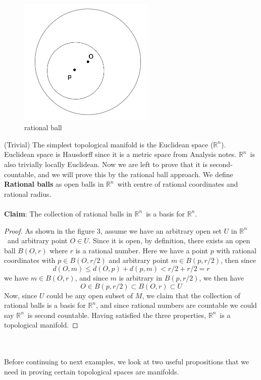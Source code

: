 \documentclass[12pt,twoside]{article}
\newcommand{\rn}{$\mathbb{R}^n$}
\begin{document}
\begin{figure}[tb]
\centering
\includegraphics[width=65mm]{rational ball.png} 
\caption{rational ball}
\end{figure}
\begin{example}{(Trivial)}
The simplest topological manifold is the Euclidean space (\rn). Euclidean space is Hausdorff since it is a metric space from Analysis notes. \rn\ is also trivially locally Euclidean. Now we are left to prove that it is second-countable, and we will prove this by the rational ball approach. We define {\bf Rational balls} as open balls in \rn\ with centre of rational coordinates and rational radius.\\
\\
{\bf Claim}: The collection of rational balls in \rn\ is a basis for \rn. \cite{intro to mfds}

\begin{proof}
As shown in the figure 3, assume we have an arbitrary open set $U$ in \rn\ and arbitrary point $O\in U$. Since it is open, by definition, there exists an open ball $B(O,r)$ where $r$ is a rational number. Here we have a point $p$ with rational coordinates with $p\in B(O,r/2)$ and arbitrary point $m\in B(p,r/2)$, then since
\[
    d(O,m)\leqslant d(O,p)+d(p,m)<r/2+r/2=r
\]
we have $m\in B(O,r)$, and since $m$ is arbitrary in $B(p,r/2)$, we then have
\[
O\in B(p,r/2)\subset B(O,r)\subset U
\]
Now, since $U$ could be any open subset of $M$, we claim that the collection of rational balls is a basis for \rn, and since rational numbers are countable we could say \rn\ is second countable.
Having satisfied the three properties, \rn\ is a topological manifold.
\end{proof}

\end{example}
\\
\\
Before continuing to next examples, we look at two useful propositions that we need in proving certain topological spaces are manifolds.
\end{document}
